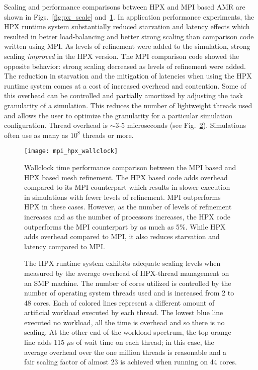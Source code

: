 \documentclass{revtex4}
\begin{document}
Scaling and performance comparisons between HPX and MPI based AMR are shown in
Figs.~\ref{fig:px_scale} and~\ref{fig:mpi_hpx_wallclock}. 
In application performance experiments, the HPX runtime system substantially
reduced starvation and latency effects which resulted in better load-balancing and better strong scaling
than comparison code written using MPI.
As levels of refinement were added to the simulation, strong
scaling {\it improved} in the HPX version.  The MPI comparison code showed the opposite behavior:
strong scaling decreased as levels of refinement were added.
The reduction in starvation and the mitigation of latencies when using the HPX runtime 
system comes at a cost of increased overhead and contention.  
Some of this overhead can be controlled and partially amortized by adjusting the
task granularity of a simulation.  This reduces the number of lightweight threads used and allows the user
to optimize the granularity for a particular simulation configuration.   Thread
overhead is $\sim$3-5 microseconds (see Fig.~\ref{fig:thread_execution_time}).  
Simulations often use as many as $10^8$ threads or more.

\begin{figure} \centering
\texttt{[image: mpi\_hpx\_wallclock]}
  \caption{\small{Wallclock time performance comparison between the MPI based and HPX
based mesh refinement.  The HPX based code adds overhead
compared to its MPI counterpart which results in slower execution in simulations with fewer
levels of refinement.  MPI outperforms HPX in these cases.  However, as the number of levels
of refinement increases and as the number of processors increases, the HPX code
outperforms the MPI counterpart by as much as 5\%.  While HPX adds overhead
compared to MPI, it also reduces starvation and latency compared to MPI.}
  }
\label{fig:mpi_hpx_wallclock}
\end{figure}


\begin{figure} \centering
{} \caption{\small{
The HPX runtime system
exhibits adequate scaling levels when measured by the average overhead
of HPX-thread management on an SMP machine.  The number of cores utilized is controlled
by the number of operating system threads used and is increased from 2 to 48 cores.
Each of colored lines represent a different amount of artificial workload executed by each
thread.  The lowest blue line executed no workload, all the time is overhead and so there
is no scaling.  At the other end of the workload spectrum, the top orange line adds
115 $\mu$s of wait time on each thread; in this case, the average overhead over
the one million threads is reasonable and a fair scaling factor of almost 23 is achieved when
running on 44 cores.}
}
\label{fig:thread_execution_time}
\end{figure}
\end{document}
